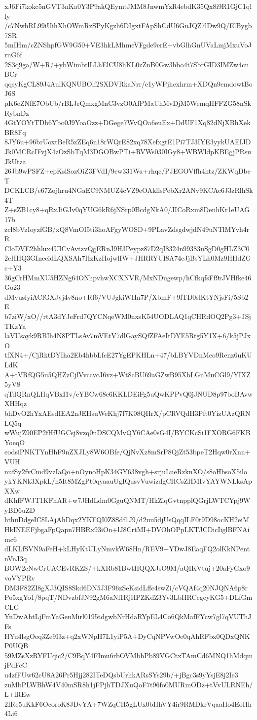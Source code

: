 xJ6Fi7kokc5nGVT3nKa0Y3P9akQEymtJMM8JnwmYzR4ebdK35Qx8i9R1GjC1qlly
/c7NwhRL99iUihXhOWmRzSPyKgzh6DIgxtFApShCdU6GuJQZ7lDw9Q/ElBygb7SR
5mIHm/cZNShpfGW9G50+VE3hkLMhmeVFgde9erE+vbGlhGnUVaLmjMxuVoJrnG6f
2S3q9ga/W+R/+ybWimbtlLLhElCU8hKL0zZnB0Gw3hbo4t7SbrGID3IMZw4cnBCr
qqsyKgCL89J4AulKQNUBOlf2SXDVRkaNrr/e1yWPjhexhrm+XDQn9cmdowtBoJ6S
pK6eZNfE7ObUb/rBLJrQmxgMnC3vzO0AfPMaUhMvDjM5WemqHFFZG58nSkRybnDz
4GtYOYtTDb6Ybo0J9YoaOzz+DGege7WvQOa6euEx+DdUF1Xq82dNjXBhXekBR8Fq
8JY6u+96brUoxtBeR5zZEq6n18rWQrE82xq78XefxgtE1Pi7TJ3IYE3yykUAEIJD
Jk0MCRcIFvjX4zOzSbTqM3DGOBwPTi+RVWs030IGy8+WBWldpKBEgjPRsuJkUtza
26Jb9wPSFZ+epKslSozOiZ3FVdI/9ew331Wa+rhqc/PJEGOVffh4htz/ZKWqDbeT
DCKLCB/e67Zojhru4NGaEC9NMUZ4cVZ9eOAkllsPebXr2ANv9KCAc6J3zRlhSk4T
Z+sZB1cy8+qRxJiGJv0qYUG6kR6jNSrp0BcdgNkA0/JICoRxm8DenhKr1eUAG17b
zcl8bVzIoyzfGB/xQ8VmOI5ti3hoAFgyWOSD+9PLavZdsgdwjdN49uNTlMYvh4rR
CloDVE2hhlux4UICvAvtzvQgERnJ9H3Peypz87D2qI8324n99383uSgD0gHLZ3C0
2eHHQ3GInecidLQXSAh7HzKzHojwlIW+JHRRYUI8A74eJjBsYLh0Mz9HHdZGc+Y3
36gCrHMmXU5HZNg64ONhpvhwXCXNVR/MxNDugewp/hCfkqfsFf9rJVHfke46Go23
dMvuslyiAClGXJvj4v8no+Rf6/VUJgkiWHn7P/XbmF+9fTD0slKtYNjsFi/5Sb2E
b7ziW/xO//rtA3dYJeFrd7QYCNqeWM0nxsK54UODLAQ1qCHRdOQ2Pg3+JSjTKzYa
laVUsayk9RBIh4N8PTLsAv7mVEtV7dlGaySQfZFAeItDYE5Rtg5Y1X+6/k5jPJxO
tfXN4+/CjRktDYIha2Eb4hbbLfcE27YgEPKHLn+47/bLBYVDnMeo9Renz6uKULdK
A+tVRfQG5u5QHZzCjlVvccvcJ6vz+Wt8cBU69aGZwB95XbLGnMuCGl9/YIXZ5yV8
qTdQRnQLHqVBxI1v/eYBCw68e6KKLDEiFg5uQwKPPvQ0jJNUD8p97boBAvwXHHqz
bhDvO2hYxAEsdIEA2nJEHsuWeKhj7f7K08QHrX/pCRVQdH3Pft0YizUAzQRNLQ5q
wWujZ90EP2fHfUGCsj8vzq0nDSCQMvQY6CAe0sG4I/BYCKcSi1FXORG6FKBYoeqO
eodsiPNKTYnHhF9nZXJLy8W6OBfe/QjNvXz8mSrP8QjZt53bpeT2Hqw0rXnn+VUH
nufSy2fvCmd9vzIaQo+nOynoHpK34GY638vgh+srjuLueRzknXO/s8oHbsoX5ilo
ykYKNk3XpkL/n5It8MZgPt0qyaauUgIQusvVuwizdgCHCsZHMIvYAYWNLksApXXw
dKhfFWJT1KFhAR+w7JHdLdm0GguQNMT/HkZlqGvtnpplQGrjLWTCYpj9WyBD6uZD
hthuDdgeIC8LAjAhDqx2YKFQI0Z8Sdf1J9/d2uu5djUsQqqILF0t9D98ocKH2eiM
HkINEEFjbgaFpQapn7HBRx93iOn+lJ8CrtMI+DVOhOPpLKTJCDicIiglBFNAimc6
dLKLfSVN9aFeH+kLHyKtULyNmvkW68Hn/REV9+YDwJ8EaqFQ2olKkNPentnVnJ3q
BOW2cNwCrUACEvRKZS/+kXRb81BwtHQQXJsO9M/aQIKVtuj+20aFyGxo9voVYPRv
DM3F82ZI8gXJ3QIS8Skd6DN5J3F96zSeKsidLffc4swZi/cVQAf4q20NJQNA6p8r
Po5xgYo1/8pqT/NDvzbfJN92gM6aNl1RjHPZKdZ3Yv3LbHRCcgeyKG5+DLfGmCLG
YnDwAbtLjFmYaGenMirl0195tdgwbNrHdaRYpEL4Co6QkMafFYcw7gl7qVUThJFs
HYu4lsgOeq3Ze9I3z+q2xWNpH7L1yiP5A+DyCqNPVwOe0qAhRFbx0QDxQNKP0UQB
59MZsXzRYFUqic2/C9BqY4FImu6rbOVMbhPb89VGCtxTAmCd6MNQ1hMdqmjPdFcC
u4zfFUw62cU8A26Pr5Hjj282ITeDQsbUrhkARsSYs29b/+jBgc3s9yYsjE8j2Ie3
zuMbPLWBhW4V40mSR8h1jFPjhTDJXuQoF7t96fo0MURmODz+tVvULRNEh/L+lREw
2IRe5uKkF6OcoroK8JDvYA+7WZqCH5gLUx0bHhVY4ir9RMDkrVqaaHo4EoHh4Li6
